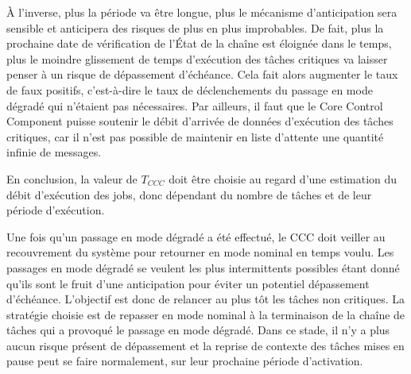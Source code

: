 \documentclass[french, a4paper, 11pt, twoside, pdftex]{StyleThese}
\begin{document}
        À l'inverse, plus la période va être longue, plus le mécanisme d'anticipation sera sensible et anticipera des risques de plus en plus improbables. De fait, plus la prochaine date de vérification de l'État de la chaîne est éloignée dans le temps, plus le moindre glissement de temps d'exécution des tâches critiques va laisser penser à un risque de dépassement d'échéance. Cela fait alors augmenter le taux de faux positifs, c'est-à-dire le taux de déclenchements du passage en mode dégradé qui n'étaient pas nécessaires. Par ailleurs, il faut que le Core Control Component puisse soutenir le débit d'arrivée de données d'exécution des tâches critiques, car il n'est pas possible de maintenir en liste d'attente une quantité infinie de messages.
        
        En conclusion, la valeur de $T_{CCC}$ doit être choisie au regard d'une estimation du débit d'exécution des jobs, donc dépendant du nombre de tâches et de leur période d'exécution. 
        
		Une fois qu'un passage en mode dégradé a été effectué, le CCC doit veiller au recouvrement du système pour retourner en mode nominal en temps voulu. Les passages en mode dégradé se veulent les plus intermittents possibles étant donné qu'ils sont le fruit d'une anticipation pour éviter un potentiel dépassement d'échéance. L'objectif est donc de relancer au plus tôt les tâches non critiques. La stratégie choisie est de repasser en mode nominal à la terminaison de la chaîne de tâches qui a provoqué le passage en mode dégradé. Dans ce stade, il n'y a plus aucun risque présent de dépassement et la reprise de contexte des tâches mises en pause peut se faire normalement, sur leur prochaine période d'activation. 
		
            
\end{document}
